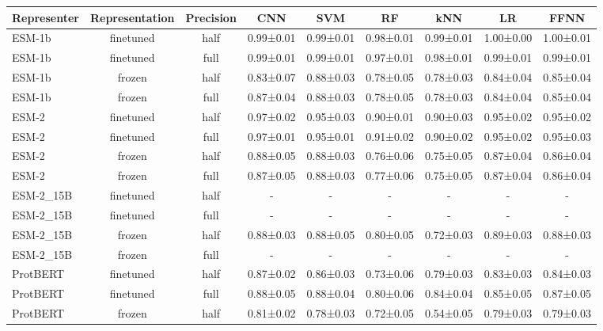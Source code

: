 \begin{tabular}{lcccccccc}
\toprule
 \textbf{Representer} & \textbf{Representation} & \textbf{Precision} &       \textbf{CNN} &       \textbf{SVM} &        \textbf{RF} &       \textbf{kNN} &        \textbf{LR} &      \textbf{FFNN} \\
\midrule
      ESM-1b &      finetuned &      half & 0.99±0.01 & 0.99±0.01 & 0.98±0.01 & 0.99±0.01 & 1.00±0.00 & 1.00±0.01 \\
      ESM-1b &      finetuned &      full & 0.99±0.01 & 0.99±0.01 & 0.97±0.01 & 0.98±0.01 & 0.99±0.01 & 0.99±0.01 \\
      ESM-1b &         frozen &      half & 0.83±0.07 & 0.88±0.03 & 0.78±0.05 & 0.78±0.03 & 0.84±0.04 & 0.85±0.04 \\
      ESM-1b &         frozen &      full & 0.87±0.04 & 0.88±0.03 & 0.78±0.05 & 0.78±0.03 & 0.84±0.04 & 0.85±0.04 \\
       ESM-2 &      finetuned &      half & 0.97±0.02 & 0.95±0.03 & 0.90±0.01 & 0.90±0.03 & 0.95±0.02 & 0.95±0.02 \\
       ESM-2 &      finetuned &      full & 0.97±0.01 & 0.95±0.01 & 0.91±0.02 & 0.90±0.02 & 0.95±0.02 & 0.95±0.03 \\
       ESM-2 &         frozen &      half & 0.88±0.05 & 0.88±0.03 & 0.76±0.06 & 0.75±0.05 & 0.87±0.04 & 0.86±0.04 \\
       ESM-2 &         frozen &      full & 0.87±0.05 & 0.88±0.03 & 0.77±0.06 & 0.75±0.05 & 0.87±0.04 & 0.86±0.04 \\
   ESM-2\_15B &      finetuned &      half &         - &         - &         - &         - &         - &         - \\
   ESM-2\_15B &      finetuned &      full &         - &         - &         - &         - &         - &         - \\
   ESM-2\_15B &         frozen &      half & 0.88±0.03 & 0.88±0.05 & 0.80±0.05 & 0.72±0.03 & 0.89±0.03 & 0.88±0.03 \\
   ESM-2\_15B &         frozen &      full &         - &         - &         - &         - &         - &         - \\
    ProtBERT &      finetuned &      half & 0.87±0.02 & 0.86±0.03 & 0.73±0.06 & 0.79±0.03 & 0.83±0.03 & 0.84±0.03 \\
    ProtBERT &      finetuned &      full & 0.88±0.05 & 0.88±0.04 & 0.80±0.06 & 0.84±0.04 & 0.85±0.05 & 0.87±0.05 \\
    ProtBERT &         frozen &      half & 0.81±0.02 & 0.78±0.03 & 0.72±0.05 & 0.54±0.05 & 0.79±0.03 & 0.79±0.03 \\

\end{tabular}
